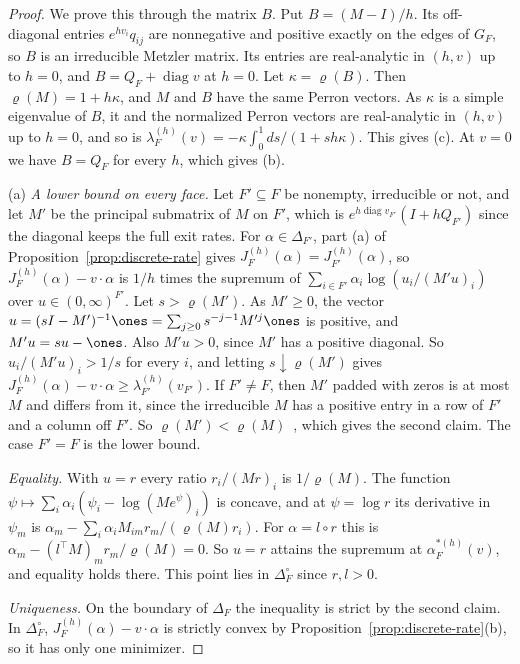 \begin{proof}
We prove this through the matrix $B$. Put $B=(M-I)/h$. Its off-diagonal entries $e^{hv_i}q_{ij}$ are nonnegative and
positive exactly on the edges of $G_F$, so $B$ is an irreducible Metzler matrix.
Its entries are real-analytic in $(h,v)$ up to $h=0$, and $B=Q_F+\operatorname{diag}v$
at $h=0$. Let $\kappa=\varrho(B)$. Then $\varrho(M)=1+h\kappa$, and $M$ and $B$
have the same Perron vectors. As $\kappa$ is a simple eigenvalue of $B$, it and the
normalized Perron vectors are real-analytic in $(h,v)$ up to $h=0$, and so is
$\lambda^{(h)}_F(v)=-\kappa\int_0^1ds/(1+sh\kappa)$. This gives (c). At $v=0$ we
have $B=Q_F$ for every $h$, which gives (b).

(a) \emph{A lower bound on every face.} Let $F'\subseteq F$ be nonempty,
irreducible or not, and let $M'$ be the principal submatrix of $M$ on $F'$, which
is $e^{h\operatorname{diag}v_{F'}}(I+hQ_{F'})$ since the diagonal keeps the full
exit rates. For $\alpha\in\Delta_{F'}$, part (a) of
Proposition~\ref{prop:discrete-rate} gives
$J^{(h)}_F(\alpha)=J^{(h)}_{F'}(\alpha)$, so $J^{(h)}_F(\alpha)-v\cdot\alpha$ is
$1/h$ times the supremum of $\sum_{i\in F'}\alpha_i\log(u_i/(M'u)_i)$ over
$u\in(0,\infty)^{F'}$. Let $s>\varrho(M')$. As $M'\ge0$, the vector
$u=(sI-M')^{-1}\ones=\sum_{j\ge0}s^{-j-1}M'^j\ones$ is positive, and $M'u=su-\ones$.
Also $M'u>0$, since $M'$ has a positive diagonal. So $u_i/(M'u)_i>1/s$ for every
$i$, and letting $s\downarrow\varrho(M')$ gives
$J^{(h)}_F(\alpha)-v\cdot\alpha\ge\lambda^{(h)}_{F'}(v_{F'})$. If $F'\ne F$, then
$M'$ padded with zeros is at most $M$ and differs from it, since the irreducible
$M$ has a positive entry in a row of $F'$ and a column off $F'$. So
$\varrho(M')<\varrho(M)$~\cite[Ch.~2]{bermanplemmons1994}, which gives the second
claim. The case $F'=F$ is the lower bound.

\emph{Equality.} With $u=r$ every ratio $r_i/(Mr)_i$ is $1/\varrho(M)$. The
function $\psi\mapsto\sum_i\alpha_i(\psi_i-\log(Me^\psi)_i)$ is concave, and at
$\psi=\log r$ its derivative in $\psi_m$ is
$\alpha_m-\sum_i\alpha_iM_{im}r_m/(\varrho(M)r_i)$. For $\alpha=l\circ r$ this is
$\alpha_m-(l^\top M)_mr_m/\varrho(M)=0$. So $u=r$ attains the supremum at
$\alpha^{*(h)}_F(v)$, and equality holds there. This point lies in $\Delta_F^\circ$
since $r,l>0$.

\emph{Uniqueness.} On the boundary of $\Delta_F$ the inequality is strict by the
second claim. In $\Delta_F^\circ$, $J^{(h)}_F(\alpha)-v\cdot\alpha$ is strictly
convex by Proposition~\ref{prop:discrete-rate}(b), so it has only one minimizer.
\end{proof}
